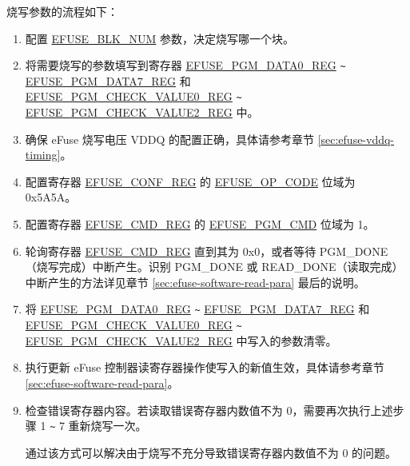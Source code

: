 \documentclass[main\_\_CN.tex]{subfiles}
\begin{document}
烧写参数的流程如下：
\begin{enumerate}
\item 配置 \hyperref[fielddesc:EFUSEBLKNUM]{EFUSE\_BLK\_NUM} 参数，决定烧写哪一个块。

\item 将需要烧写的参数填写到寄存器 \hyperref[regdesc:EFUSEPGMDATANREG]{EFUSE\_PGM\_DATA0\_REG} \verb+~+ \hyperref[regdesc:EFUSEPGMDATANREG]{EFUSE\_PGM\_DATA7\_REG} 和\\ \hyperref[regdesc:EFUSEPGMCHECKVALUEMREG]{EFUSE\_PGM\_CHECK\_VALUE0\_REG}  \verb+~+  \hyperref[regdesc:EFUSEPGMCHECKVALUEMREG]{EFUSE\_PGM\_CHECK\_VALUE2\_REG} 中。


\item 确保 eFuse 烧写电压 VDDQ 的配置正确，具体请参考章节 \ref{sec:efuse-vddq-timing}。

\item 配置寄存器 \hyperref[regdesc:EFUSECONFREG]{EFUSE\_CONF\_REG} 的 \hyperref[fielddesc:EFUSEOPCODE]{EFUSE\_OP\_CODE} 位域为 0x5A5A。

\item 配置寄存器 \hyperref[regdesc:EFUSECMDREG]{EFUSE\_CMD\_REG} 的 \hyperref[fielddesc:EFUSEPGMCMD]{EFUSE\_PGM\_CMD} 位域为 1。

\item 轮询寄存器 \hyperref[regdesc:EFUSECMDREG]{EFUSE\_CMD\_REG} 直到其为 0x0，或者等待 PGM\_DONE（烧写完成）中断产生。识别 PGM\_DONE 或 READ\_DONE（读取完成）中断产生的方法详见章节 \ref{sec:efuse-software-read-para} 最后的说明。

\item 将 \hyperref[regdesc:EFUSEPGMDATANREG]{EFUSE\_PGM\_DATA0\_REG} \verb+~+ \hyperref[regdesc:EFUSEPGMDATANREG]{EFUSE\_PGM\_DATA7\_REG} 和\\ \hyperref[regdesc:EFUSEPGMCHECKVALUEMREG]{EFUSE\_PGM\_CHECK\_VALUE0\_REG}  \verb+~+  \hyperref[regdesc:EFUSEPGMCHECKVALUEMREG]{EFUSE\_PGM\_CHECK\_VALUE2\_REG} 中写入的参数清零。

\item 执行更新 eFuse 控制器读寄存器操作使写入的新值生效，具体请参考章节 \ref{sec:efuse-software-read-para}。
\item 检查错误寄存器内容。若读取错误寄存器内数值不为 0，需要再次执行上述步骤 1 \verb+~+ 7 重新烧写一次。

通过该方式可以解决由于烧写不充分导致错误寄存器内数值不为 0 的问题。


\end{enumerate}
\end{document}
